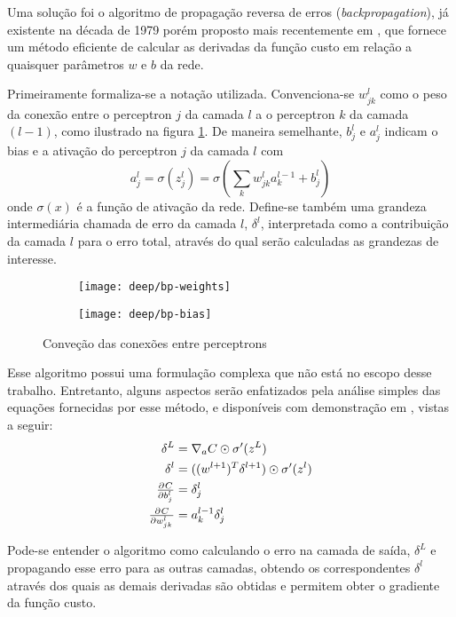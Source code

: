 Uma solução foi o algoritmo de propagação reversa de erros (\textit{backpropagation}), já existente na década de 1979 porém proposto mais recentemente em \cite{backpropagation}, que fornece um método eficiente de calcular as derivadas da função custo em relação a quaisquer parâmetros $w$ e $b$ da rede.

Primeiramente formaliza-se a notação utilizada. Convenciona-se $w_{jk}^l$ como o peso da conexão entre o perceptron $j$ da camada $l$ a o perceptron $k$ da camada $(l-1)$, como ilustrado na figura \ref{fig:bp}. De maneira semelhante, $b^l_j$ e $a^l_j$ indicam o bias e a ativação do perceptron $j$ da camada $l$ com
\begin{equation}
a^l_j = \sigma (z^l_j) =\sigma \left( \sum_k w_{jk}^l a_k^{l-1} + b_j^l \right)
\end{equation}
onde $\sigma(x)$ é a função de ativação da rede. Define-se também uma grandeza intermediária chamada de erro da camada $l$, $\delta^l$, interpretada como a contribuição da camada $l$ para o erro total, através do qual serão calculadas as grandezas de interesse.

\begin{figure}[ht]
\centering
\begin{subfigure}{.5\textwidth}
  \centering
  \texttt{[image: deep/bp-weights]}
\end{subfigure}%
\begin{subfigure}{.5\textwidth}
  \centering
  \texttt{[image: deep/bp-bias]}
\end{subfigure}
\caption{Conveção das conexões entre perceptrons}
\label{fig:bp}
\end{figure}

Esse algoritmo possui uma formulação complexa que não está no escopo desse trabalho. Entretanto, alguns aspectos serão enfatizados pela análise simples das equações fornecidas por esse método, e disponíveis com demonstração em \cite{NeuralNetsDeep}, vistas a seguir:
\begin{align}
\delta^L &= \nabla_a C \odot \sigma^\prime(z^L) \\ 
\delta^l &= ((w^{l+1})^T\delta^{l+1}) \odot \sigma^\prime(z^l) \\
\pd{C}{b_j^l{}} &= \delta_j^l \\ 
\pd{C}{w_{jk}^l{}} &= a_k^{l-1} \delta_j^l 
\end{align}

Pode-se entender o algoritmo como calculando o erro na camada de saída, $\delta^L$ e propagando esse erro para as outras camadas, obtendo os correspondentes $\delta^l$ através dos quais as demais derivadas são obtidas e permitem obter o gradiente da função custo. 

